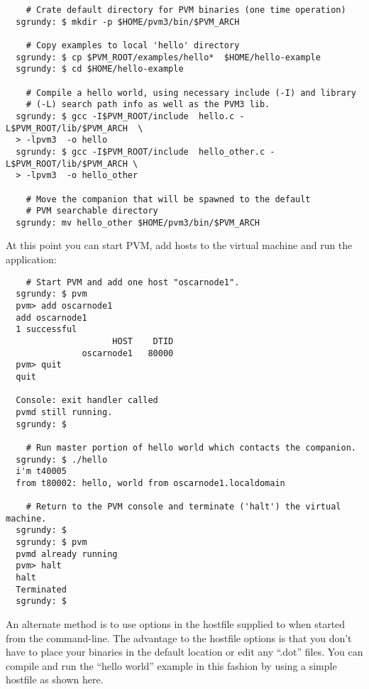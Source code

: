 \begin{small}
\begin{verbatim}
    # Crate default directory for PVM binaries (one time operation)
  sgrundy: $ mkdir -p $HOME/pvm3/bin/$PVM_ARCH

    # Copy examples to local 'hello' directory
  sgrundy: $ cp $PVM_ROOT/examples/hello*  $HOME/hello-example
  sgrundy: $ cd $HOME/hello-example

    # Compile a hello world, using necessary include (-I) and library
    # (-L) search path info as well as the PVM3 lib.
  sgrundy: $ gcc -I$PVM_ROOT/include  hello.c -L$PVM_ROOT/lib/$PVM_ARCH  \
  > -lpvm3  -o hello
  sgrundy: $ gcc -I$PVM_ROOT/include  hello_other.c -L$PVM_ROOT/lib/$PVM_ARCH \
  > -lpvm3  -o hello_other

    # Move the companion that will be spawned to the default 
    # PVM searchable directory
  sgrundy: mv hello_other $HOME/pvm3/bin/$PVM_ARCH
\end{verbatim}
\end{small}

\noindent At this point you can start PVM, add hosts to the virtual
machine and run the application:

\begin{small}
\begin{verbatim}
    # Start PVM and add one host "oscarnode1".
  sgrundy: $ pvm
  pvm> add oscarnode1
  add oscarnode1
  1 successful
                     HOST    DTID
               oscarnode1   80000
  pvm> quit
  quit

  Console: exit handler called
  pvmd still running.
  sgrundy: $

    # Run master portion of hello world which contacts the companion.
  sgrundy: $ ./hello
  i'm t40005
  from t80002: hello, world from oscarnode1.localdomain

    # Return to the PVM console and terminate ('halt') the virtual machine.
  sgrundy: $
  sgrundy: $ pvm
  pvmd already running
  pvm> halt
  halt
  Terminated
  sgrundy: $
\end{verbatim}
\end{small}

An alternate method is to use options in the hostfile supplied to
 when started from the command-line.  The advantage to the
hostfile options is that you don't have to place your binaries in the
default location or edit any ``.dot'' files.  You can compile and run
the ``hello world'' example in this fashion by using a simple hostfile
as shown here.  

